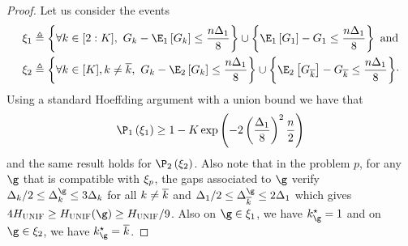 \begin{proof}
	\noindent
	Let us consider the events
	\begin{align*}
	\eventc_1 &\triangleq \left\{ \forall k\in\setArmsmo,~  \cumulGain_{k}-
	\Exp_1\left[\cumulGain_{k}\right] \leq  \frac{\timeHorizon \gap_1}{8} \right\} 
	\cup \left\{  \Exp_1\left[\cumulGain_{1}\right]-\cumulGain_{1} 
	\leq  \frac{\timeHorizon \gap_1}{8} \right\} \text{\ and}\\
%	
	\eventc_2 &\triangleq \left\{ \forall k\in\setArms, k\neq \refarm,~   
	\cumulGain_{k}-\Exp_2\left[\cumulGain_{k}\right] \leq  \frac{\timeHorizon \gap_1 }{8}
	\right\} \cup \left\{  \Exp_2\left[
	\cumulGain_{\refarm}\right]-\cumulGain_{\refarm} \leq  \frac{\timeHorizon \gap_1 }{8}\right\}\!\cdot
	\end{align*}
	Using a standard Hoeffding argument with a 
	union bound we have that 
	\[
	\Pro_1\left(\eventc_1\right) \geq 1-\nArms\exp\left(
	-2\left(\frac{\gap_1}{8}\right)^2\frac{\timeHorizon}{2}\right)
	\] %
	and the same result holds for $\Pro_2\left(\eventc_2\right)$.
	Also note that  in the  problem $p$, for 
	any $\gainVector$ that is compatible with 
	$\xi_p$, the gaps associated to $\gainVector$ verify
	$\gap_k/2\leq\gap^{\gainVector}_k\leq 3 \gap_k$ for all $k\neq \overline k$
	and $\gap_1/2\leq\gap^{\gainVector}_{\refarm}\leq2\gap_1$
which gives $4\complexityUnif\geq\complexityUnif(\gainVector)\geq
 \complexityUnif/9$. Also on $\gainVector\in\eventc_1$, 
 we have $\bestArm_\gainVector=1$ and  on $\gainVector\in\eventc_2$, we have $\bestArm_\gainVector=\refarm$.
	

\end{proof}
